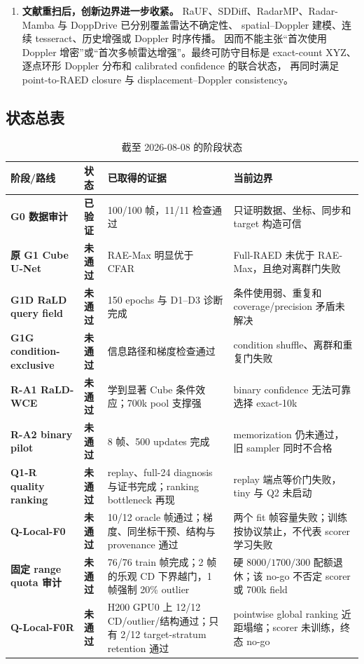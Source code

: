 \documentclass[11pt,a4paper,fontset=none]{ctexart}
\newcommand{\done}{\textcolor{RadarGreen}{\textbf{已验证}}}
\newcommand{\closed}{\textcolor{RadarRed}{\textbf{未通过}}}
\begin{document}
\begin{enumerate}
  \item \textbf{文献重扫后，创新边界进一步收紧。}
  RaUF、SDDiff、RadarMP、Radar-Mamba 与 DoppDrive 已分别覆盖雷达不确定性、
  spatial--Doppler 建模、连续 tesseract、历史增强或 Doppler 时序传播。
  因而不能主张“首次使用 Doppler 增密”或“首次多帧雷达增强”。最终可防守目标是
  exact-count XYZ、逐点环形 Doppler 分布和 calibrated confidence 的联合状态，
  再同时满足 point-to-RAED closure 与 displacement--Doppler consistency。
\end{enumerate}

\subsection{状态总表}

\begin{table}[H]
\centering
\small
\caption{截至 2026-08-08 的阶段状态}
\begin{tabularx}{\textwidth}{>{\bfseries}p{2.2cm} p{2.3cm} Y Y}
\toprule
阶段/路线 & 状态 & 已取得的证据 & 当前边界 \\
\midrule
G0 数据审计 & \done & 100/100 帧，11/11 检查通过 & 只证明数据、坐标、同步和 target 构造可信 \\
原 G1 Cube U-Net & \closed & RAE-Max 明显优于 CFAR & Full-RAED 未优于 RAE-Max，且绝对离群门失败 \\
G1D RaLD query field & \closed & 150 epochs 与 D1--D3 诊断完成 & 条件使用弱、重复和 coverage/precision 矛盾未解决 \\
G1G condition-exclusive & \closed & 信息路径和梯度检查通过 & condition shuffle、离群和重复门失败 \\
R-A1 RaLD-WCE & \closed & 学到显著 Cube 条件效应；700k pool 支撑强 & binary confidence 无法可靠选择 exact-10k \\
R-A2 binary pilot & \closed & 8 帧、500 updates 完成 & memorization 仍未通过，旧 sampler 同时不合格 \\
Q1-R quality ranking & \closed & replay、full-24 diagnosis 与证书完成；ranking bottleneck 再现 & replay 端点等价门失败，tiny 与 Q2 未启动 \\
Q-Local-F0 & \closed & 10/12 oracle 帧通过；梯度、同坐标干预、结构与 provenance 通过 & 两个 fit 帧容量失败；训练按协议禁止，不代表 scorer 学习失败 \\
固定 range quota 审计 & \closed & 76/76 train 帧完成；2 帧的乐观 CD 下界越门，1 帧强制 20\% outlier & 硬 $8000/1700/300$ 配额退休；该 no-go 不否定 scorer 或 700k field \\
Q-Local-F0R & \closed & H200 GPU0 上 12/12 CD/outlier/结构通过；只有 2/12 target-stratum retention 通过 & pointwise global ranking 近距塌缩；scorer 未训练，终态 no-go \\

\end{tabularx}
\end{table}
\end{document}
